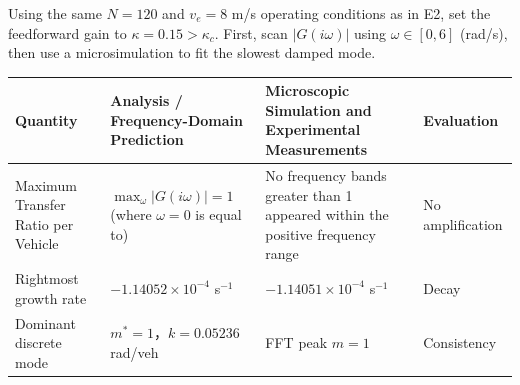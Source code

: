 \documentclass[11pt,a4paper,openany]{book}
\numberwithin{equation}{chapter}
\numberwithin{figure}{chapter}
\numberwithin{table}{chapter}
\begin{document}
Using the same $N=120$ and $v_e=8$ m/s operating conditions as in E2, set the feedforward gain to $\kappa=0.15>\kappa_c$. First, scan $|G(i\omega)|$ using $\omega\in[0,6]$ (rad/s), then use a microsimulation to fit the slowest damped mode.










\begin{center}
\small
{}
\label{tab:e2e4-front-feedforward}
\begin{tabular}{p{3.1cm}p{4.2cm}p{4.2cm}p{2.2cm}}
\toprule
\textbf{Quantity} & \textbf{Analysis / Frequency-Domain Prediction} & \textbf{Microscopic Simulation and Experimental Measurements} & \textbf{Evaluation} \\
\midrule







Maximum Transfer Ratio per Vehicle




&




$\max_\omega|G(i\omega)|=1$ (where $\omega=0$ is equal to)




&




 No frequency bands greater than 1 appeared within the positive frequency range




&




No amplification



\\[3pt]

Rightmost growth rate




& $-1.14052\times10^{-4}$ s$^{-1}$ & $-1.14051\times10^{-4}$ s$^{-1}$ &




Decay



\\[3pt]

Dominant discrete mode




& $m^*=1$，$k=0.05236$ rad/veh &




FFT peak $m=1$




&




Consistency



\\
\bottomrule
\end{tabular}
\end{center}
\end{document}
